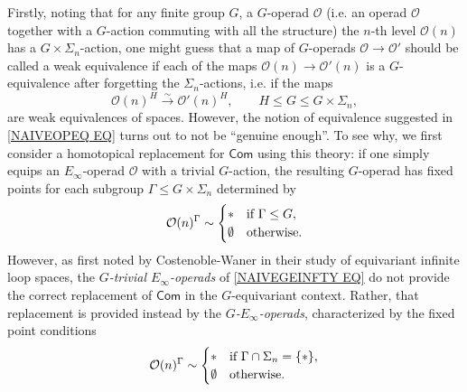 \documentclass[a4paper,10pt
,draft
]{article}%
\numberwithin{equation}{section}
\numberwithin{figure}{section}
\theoremstyle{definition} %
\renewcommand{\O}{\ensuremath{\mathcal O}}
\newcommand{\1}{\ensuremath{\mathbbm 1}}%
\begin{document}
Firstly, noting that for any finite group $G$, a $G$-operad $\O$ (i.e. an operad $\O$ together with a $G$-action commuting with all the structure)
the $n$-th level $\O(n)$ has a $G \times \Sigma_n$-action,
one might guess that a map of $G$-operads
$\O \to \O'$
should be called a weak equivalence if each of the maps
$\O(n) \to \O'(n)$
is a $G$-equivalence after forgetting the $\Sigma_n$-actions, 
i.e. if the maps
\begin{equation}\label{NAIVEOPEQ EQ}
	\O(n)^H \xrightarrow{\sim} \O'(n)^H, \qquad H \leq G \leq G\times \Sigma_n,
\end{equation}
are weak equivalences of spaces. 
However, the notion of equivalence suggested in \eqref{NAIVEOPEQ EQ} turns out to not be ``genuine enough''.
To see why, we first consider a homotopical replacement for $\mathsf{Com}$ using this theory: 
if one simply equips an $E_{\infty}$-operad $\O$ with a trivial $G$-action, the resulting $G$-operad has fixed points for each subgroup $\Gamma \leq G \times \Sigma_n$
determined by
\begin{equation}\label{NAIVEGEINFTY EQ}
	\O(n)^{\Gamma} \sim 
\begin{cases}
	\** & \text{if } \Gamma \leq G,
\\
	\emptyset & \text{otherwise}.
\end{cases}
\end{equation}
However, as first noted by Costenoble-Waner \cite{CW91} in their study of equivariant infinite loop spaces,
the \textit{$G$-trivial $E_\infty$-operads} of \eqref{NAIVEGEINFTY EQ} do not provide 
the correct replacement of $\mathsf{Com}$
 in the $G$-equivariant context. 
Rather, that replacement is provided instead by the 
\textit{$G$-$E_{\infty}$-operads}, characterized by the fixed point conditions
\begin{equation}\label{GENGEINFTY EQ}
	\O(n)^{\Gamma} \sim 
\begin{cases}
	\** & \text{if } \Gamma \cap \Sigma_n = \{\**\},
\\
	\emptyset & \text{otherwise}.
\end{cases}
\end{equation}
\end{document}
